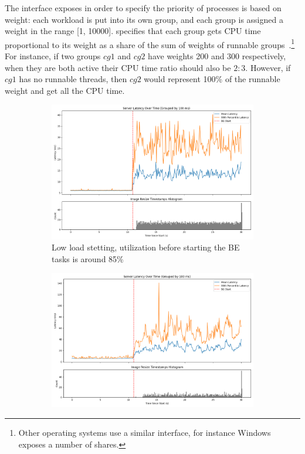 The interface \cgroups{} exposes in order to specify the priority of processes
is based on weight: each workload is put into its own group, and each group is
assigned a weight in the range [1, 10000]. \cgroups{} specifies that each group
gets CPU time proportional to its weight as a share of the sum of weights of
runnable groups~\cite{TODO}.\footnote{Other operating systems use a similar
interface, for instance Windows exposes a number of shares.} For instance, if
two groups $cg1$ and $cg2$ have weights 200 and 300 respectively, when they are
both active their CPU time ratio should also be $2:3$. However, if $cg1$ has no
runnable threads, then $cg2$ would represent 100\% of the runnable weight and
get all the CPU time.

\begin{figure}[t]
    \centering
    \begin{subfigure}[b]{0.49\columnwidth}
        \includegraphics[width=\columnwidth]{graphs/unedited-weight-low-two.png}
        \caption{Low load stetting, utilization before starting the BE tasks is
        around 85\%}\label{fig:unedited-weight-low-two}
    \end{subfigure}
    \hspace{\fill}
    \begin{subfigure}[b]{0.49\columnwidth}
        \includegraphics[width=\columnwidth]{graphs/unedited-weight-high-two.png}

\end{subfigure}
\end{figure}

